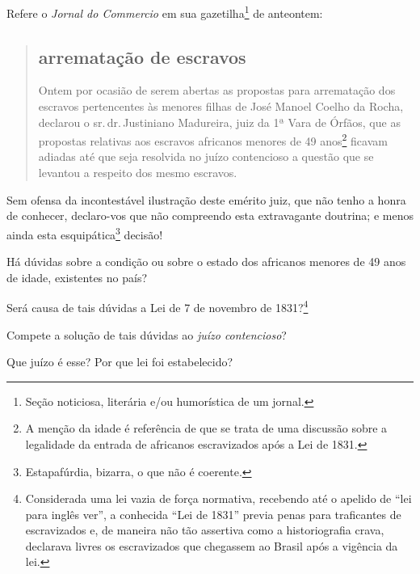 Refere o \emph{Jornal do Commercio} em sua gazetilha\footnote{Seção 
  noticiosa, literária e/ou humorística de um jornal.} de anteontem:

\begin{quote}
\subsection{arrematação de escravos}

Ontem por ocasião de serem abertas as propostas para arrematação dos
escravos pertencentes às menores filhas de José Manoel Coelho da Rocha,
declarou o sr.\,dr.\,Justiniano Madureira, juiz da 1ª Vara de Órfãos, que
as propostas relativas aos escravos africanos menores de 49
anos\footnote{A menção da idade é referência de que se trata de uma
  discussão sobre a legalidade da entrada de africanos escravizados após
  a Lei de 1831.} ficavam adiadas até que seja resolvida no juízo
contencioso a questão que se levantou a respeito dos mesmo escravos.
\end{quote}

Sem ofensa da incontestável ilustração deste emérito juiz, que não tenho
a honra de conhecer, declaro-vos que não compreendo esta extravagante
doutrina; e menos ainda esta esquipática\footnote{Estapafúrdia,
  bizarra, o que não é coerente.} decisão!

Há dúvidas sobre a condição ou sobre o estado dos africanos menores de
49 anos de idade, existentes no país?

Será causa de tais dúvidas a Lei de 7 de novembro de 1831?\footnote{
  Considerada uma lei vazia de força normativa, recebendo até o apelido
  de ``lei para inglês ver'', a conhecida ``Lei de 1831'' previa penas para
  traficantes de escravizados e, de maneira não tão assertiva como a
  historiografia crava, declarava livres os escravizados que chegassem
  ao Brasil após a vigência da lei.}

Compete a solução de tais dúvidas ao \emph{juízo contencioso}?

Que juízo é esse? Por que lei foi estabelecido?

